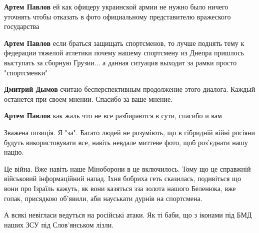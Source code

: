 \begin{itemize}
\begin{itemize}
\textbf{Артем Павлов} ей как офицеру украинской армии не нужно было ничего
уточнять чтобы отказать в фото официальному представителю вражеского
государства

 
\textbf{Артем Павлов} если браться защищать спортсменов, то лучше поднять тему
к федерации тяжелой атлетики почему нашему спортсмену из Днепра пришлось
выступать за сборную Грузии... а данная ситуация выходит за рамки просто
"спортсменки"

 
\textbf{Дмитрий Дымов} считаю бесперспективным продолжение этого диалога. Каждый останется при своем мнении. Спасибо за ваше мнение.

 
\textbf{Артем Павлов} как жаль что не все разбираются в сути, спасибо и вам
\end{itemize}

 

Зважена позиція. Я "за". Багато людей не розуміють, що в гібридній війні
росіяни будуть використовувати все, навіть невдале миттеве фото, щоб роз'єднати
нашу націю. 

Це війна. Вже навіть наше Міноборони в це включилось. Тому що це справжній
військовий інформаційний напад. Іхня бобриха геть сказилась, подивіться що вони
про Ізраїль кажуть, як вони казяться зза золота нашого Беленюка, вже гопак,
присядкою об'явили, аби науськати дурнів на спортсмена.

А всякі невігласи ведуться на російські атаки. Як ті баби, що з іконами під БМД
наших ЗСУ під Слов'янськом лізли.


\end{itemize}
